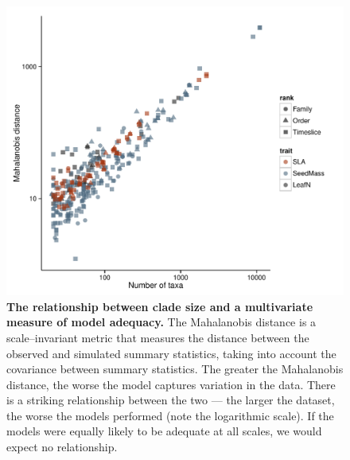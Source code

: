 \documentclass[a4paper,12pt]{article}
\begin{document}
\begin{figure}[p]
  \centering
  \includegraphics[scale=0.9]{figs/ad-size-ml}
  \caption{\textbf{The relationship between clade size and a multivariate measure of model adequacy.} The Mahalanobis distance is a scale--invariant metric that measures the distance between the observed and simulated summary statistics, taking into account the covariance between summary statistics. The greater the Mahalanobis distance, the worse the model captures variation in the data. There is a striking relationship between the two --- the larger the dataset, the worse the models performed (note the logarithmic scale). If the models were equally likely to be adequate at all scales, we would expect no relationship.}
  \label{fig:size-adequacy}
\end{figure}

\renewcommand\thefigure{Box\arabic{figure}}
\renewcommand\thetable{Box \arabic{table}}
\setcounter{figure}{0}    
\setcounter{table}{0} 
\end{document}
